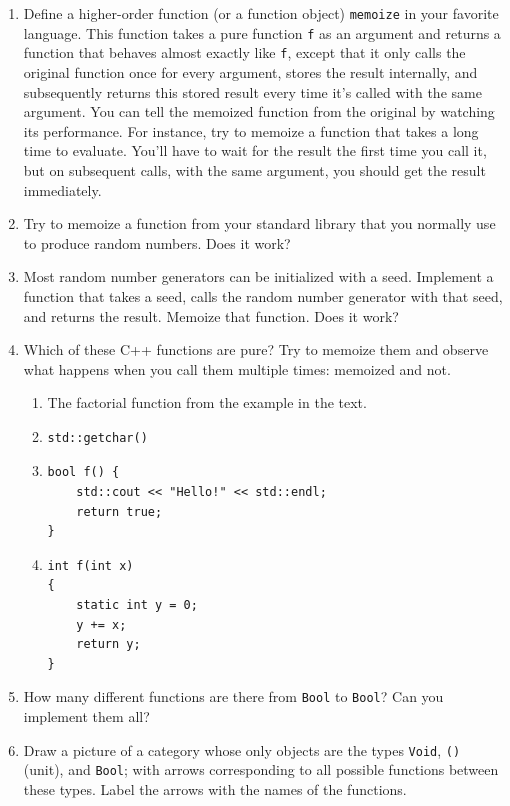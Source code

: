 \begin{enumerate}
\item
  Define a higher-order function (or a function object) \texttt{memoize}
  in your favorite language. This function takes a pure function
  \texttt{f} as an argument and returns a function that behaves almost
  exactly like \texttt{f}, except that it only calls the original
  function once for every argument, stores the result internally, and
  subsequently returns this stored result every time it's called with
  the same argument. You can tell the memoized function from the
  original by watching its performance. For instance, try to memoize a
  function that takes a long time to evaluate. You'll have to wait for
  the result the first time you call it, but on subsequent calls, with
  the same argument, you should get the result immediately.
\item
  Try to memoize a function from your standard library that you normally
  use to produce random numbers. Does it work?
\item
  Most random number generators can be initialized with a seed.
  Implement a function that takes a seed, calls the random number
  generator with that seed, and returns the result. Memoize that
  function. Does it work?
\item
  Which of these C++ functions are pure? Try to memoize them and observe
  what happens when you call them multiple times: memoized and not.

  \begin{enumerate}
  \item
    The factorial function from the example in the text.
  \item
\begin{verbatim}
std::getchar()
\end{verbatim}
  \item
\begin{verbatim}
bool f() { 
    std::cout << "Hello!" << std::endl;
    return true;
}
\end{verbatim}
  \item
\begin{verbatim}
int f(int x)
{
    static int y = 0;
    y += x;
    return y;
}
\end{verbatim}
  \end{enumerate}
\item
  How many different functions are there from \texttt{Bool} to
  \texttt{Bool}? Can you implement them all?
\item
  Draw a picture of a category whose only objects are the types
  \texttt{Void}, \texttt{()} (unit), and \texttt{Bool}; with arrows
  corresponding to all possible functions between these types. Label the
  arrows with the names of the functions.
\end{enumerate}